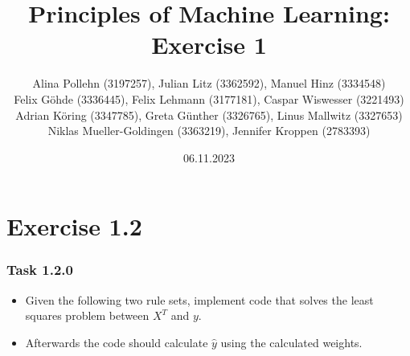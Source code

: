 \documentclass[10pt,aspectratio=169,handout]{beamer}
\begin{document}
\title{Principles of Machine Learning: Exercise 1}
\date{06.11.2023}
\author{Alina Pollehn (3197257), Julian Litz (3362592), Manuel Hinz (3334548)\\
    Felix Göhde (3336445), Felix Lehmann (3177181), Caspar Wiswesser (3221493)\\
    Adrian Köring (3347785), Greta Günther (3326765), Linus Mallwitz (3327653)\\
    Niklas Mueller-Goldingen (3363219), Jennifer Kroppen (2783393)}

\begin{frame}
    \maketitle
\end{frame}

\section{Exercise 1.2}


\begin{frame}
    \frametitle{Task 1.2.0}
    \begin{itemize}
        \item Given the following two rule sets, implement code that solves the least squares problem between $X^T$ and $y$.
        \item Afterwards the code should calculate $\hat{y}$ using the calculated weights.
    \end{itemize}
\end{frame}
\end{document}

